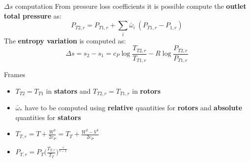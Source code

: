 	\begin{frame}{$\Delta s$ computation}
		From pressure loss coefficients it is possible compute the \textbf{outlet total pressure} as: 
		\begin{equation}
			P_{T2,r} = P_{T1,r} + \sum_i \bar{\omega}_{i} \ (P_{T1,r} - P_{1,r}) \nonumber
		\end{equation}
		The \textbf{entropy variation} is computed as: 
		\begin{equation}
			\Delta s = s_2 - s_1 = c_P \log{\frac{T_{T2,r}}{T_{T1,r}}} - R \log{\frac{P_{T2,r}}{P_{T1,r}}} \nonumber
		\end{equation}
		\vspace{-0.5cm}
		\begin{alertblock}{Frames}
			\begin{itemize}
				\item $T_{T2} = T_{T1}$ in \textbf{stators} and $T_{T2,r} = T_{T1,r}$ in \textbf{rotors}
				\item $\bar{\omega}_{*}$ have to be computed using \textbf{relative} quantities for \textbf{rotors} and \textbf{absolute} quantities for \textbf{stators}
				\item $T_{T,r} = T + \frac{W^2}{2 c_P} = T_T + \frac{W^2 - V^2}{2 c_P}$
				\item $P_{T,r} = P_T \Big( \frac{T_{T,r}}{T_T} \Big)^{\frac{\gamma}{\gamma - 1}}$
			\end{itemize}
		\end{alertblock}
	\end{frame}

